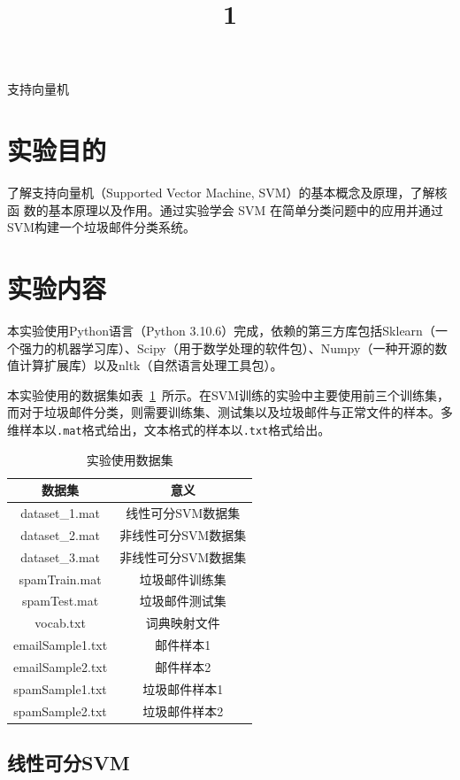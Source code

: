 \documentclass{SEU-AI-Report}
\begin{document}
\title{1}{支持向量机}

\section{实验目的}
了解支持向量机（Supported Vector Machine, SVM）的基本概念及原理，了解核函
数的基本原理以及作用。通过实验学会 SVM 在简单分类问题中的应用并通过
SVM构建一个垃圾邮件分类系统。

\section{实验内容}
本实验使用Python语言（Python 3.10.6）完成，依赖的第三方库包括Sklearn（一个强力的机器学习库）、Scipy（用于数学处理的软件包）、Numpy（一种开源的数值计算扩展库）以及nltk（自然语言处理工具包）。

本实验使用的数据集如表~\ref{tab:dataset}~所示。在SVM训练的实验中主要使用前三个训练集，而对于垃圾邮件分类，则需要训练集、测试集以及垃圾邮件与正常文件的样本。多维样本以\texttt{.mat}格式给出，文本格式的样本以\texttt{.txt}格式给出。
\begin{table}[htbp]
    \centering
    
    
    \begin{tabular}{cc}
        \toprule
        数据集 & 意义 \\
        \midrule
        dataset\_1.mat		& 线性可分SVM数据集\\
        dataset\_2.mat		& 非线性可分SVM数据集\\
        dataset\_3.mat		& 非线性可分SVM数据集\\
        spamTrain.mat		& 垃圾邮件训练集\\
        spamTest.mat		& 垃圾邮件测试集\\
        vocab.txt			& 词典映射文件\\
        emailSample1.txt	& 邮件样本1\\
        emailSample2.txt	& 邮件样本2\\
        spamSample1.txt		& 垃圾邮件样本1\\
        spamSample2.txt		& 垃圾邮件样本2\\
        \bottomrule

    \end{tabular}
    \caption{实验使用数据集}
    \label{tab:dataset}
\end{table}
\subsection{线性可分SVM}
\end{document}
